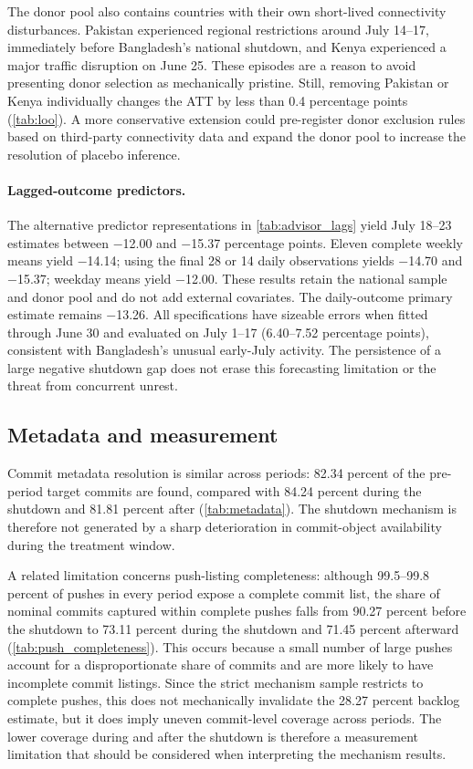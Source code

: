 The donor pool also contains countries with their own short-lived connectivity disturbances. Pakistan experienced regional restrictions around July 14--17, immediately before Bangladesh's national shutdown, and Kenya experienced a major traffic disruption on June 25. These episodes are a reason to avoid presenting donor selection as mechanically pristine. Still, removing Pakistan or Kenya individually changes the ATT by less than 0.4 percentage points (\cref{tab:loo}). A more conservative extension could pre-register donor exclusion rules based on third-party connectivity data and expand the donor pool to increase the resolution of placebo inference.



\paragraph{Lagged-outcome predictors.} The alternative predictor representations in \cref{tab:advisor_lags} yield July 18--23 estimates between $-$12.00 and $-$15.37 percentage points. Eleven complete weekly means yield $-$14.14; using the final 28 or 14 daily observations yields $-$14.70 and $-$15.37; weekday means yield $-$12.00. These results retain the national sample and donor pool and do not add external covariates. The daily-outcome primary estimate remains $-$13.26. All specifications have sizeable errors when fitted through June 30 and evaluated on July 1--17 (6.40--7.52 percentage points), consistent with Bangladesh's unusual early-July activity. The persistence of a large negative shutdown gap does not erase this forecasting limitation or the threat from concurrent unrest.




\subsection{Metadata and measurement}
\label{sec:measurement}

Commit metadata resolution is similar across periods: 82.34 percent of the pre-period target commits are found, compared with 84.24 percent during the shutdown and 81.81 percent after (\cref{tab:metadata}). The shutdown mechanism is therefore not generated by a sharp deterioration in commit-object availability during the treatment window.

A related limitation concerns push-listing completeness: although 99.5--99.8 percent of pushes in every period expose a complete commit list, the share of nominal commits captured within complete pushes falls from 90.27 percent before the shutdown to 73.11 percent during the shutdown and 71.45 percent afterward (\cref{tab:push_completeness}). This occurs because a small number of large pushes account for a disproportionate share of commits and are more likely to have incomplete commit listings. Since the strict mechanism sample restricts to complete pushes, this does not mechanically invalidate the 28.27 percent backlog estimate, but it does imply uneven commit-level coverage across periods. The lower coverage during and after the shutdown is therefore a measurement limitation that should be considered when interpreting the mechanism results.

